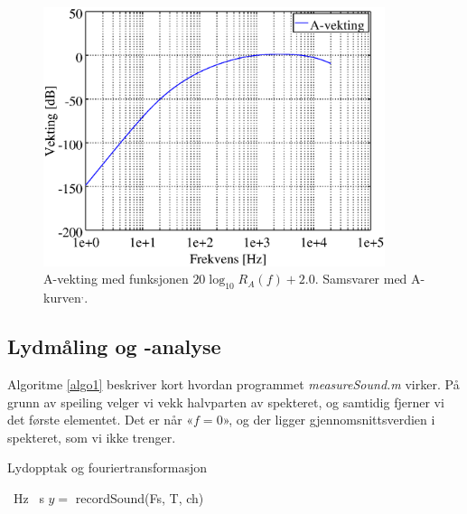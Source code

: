 \documentclass[norsk, twocolumn,letterpaper,11pt,fleqn]{extarticle}
\begin{document}
\begin{figure}[h!]
	\centering
	\includegraphics[width=100mm]{A-vekting.eps}
	\caption[]{A-vekting med funksjonen $20 \log_{10}R_A(f) + 2.0$. 
		Samsvarer med A-kurven\footnotemark[4]$^{,}$\footnotemark[5].}
	\label{fig:3}
\end{figure}

\subsection{Lydmåling og -analyse}
Algoritme \ref{algo1} beskriver kort hvordan programmet \textit{measureSound.m} virker.
På grunn av speiling velger vi vekk halvparten av spekteret, og samtidig fjerner
vi det første elementet. Det er når «$f=0$», 
og der ligger gjennomsnittsverdien i spekteret,
som vi ikke trenger.
\label{sub:lydanalyse}
\begin{algorithm}[H]
	\caption{Lydopptak og fouriertransformasjon}\label{algo1}
  \begin{algorithmic}[1]
     \SI{}{\Hz}
     \SI{}{\s}
    \State $y=$ recordSound(Fs, T, ch)
    \EndFor
  \end{algorithmic}
\end{algorithm}
\end{document}
